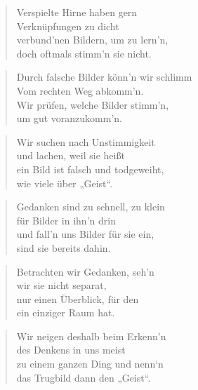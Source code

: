 \documentclass[10pt,a4paper]{article}
\begin{document}
\begin{multicols}{2}
\begin{verse}
Verspielte Hirne haben gern \\
Verknüpfungen zu dicht \\
verbund’nen Bildern, um zu lern’n, \\
doch oftmals stimm’n sie nicht. \\
\end{verse}

\begin{verse}
Durch falsche Bilder könn’n wir schlimm \\
Vom rechten Weg abkomm’n. \\
Wir prüfen, welche Bilder stimm’n, \\
um gut voranzukomm’n. \\
\end{verse}

\begin{verse}
Wir suchen nach Unstimmigkeit \\
und lachen, weil sie heißt \\
ein Bild ist falsch und todgeweiht, \\
wie viele über „Geist“. \\
\end{verse}

\begin{verse}
Gedanken sind zu schnell, zu klein \\
für Bilder in ihn’n drin \\
und fall’n uns Bilder für sie ein, \\
sind sie bereits dahin. \\
\end{verse}

\begin{verse}
Betrachten wir Gedanken, seh’n \\
wir sie nicht separat, \\
nur einen Überblick, für den \\
ein einziger Raum hat. \\
\end{verse}

\begin{verse}
Wir neigen deshalb beim Erkenn’n \\
des Denkens in uns meist \\
zu einem ganzen Ding und nenn‘n \\
das Trugbild dann den „Geist“. \\
\end{verse}


\end{multicols}
\end{document}
